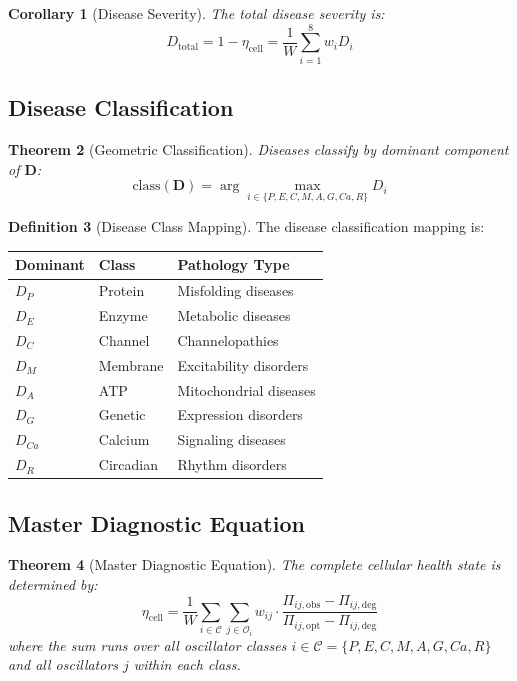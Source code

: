 \documentclass[10pt,twocolumn]{article}
\theoremstyle{plain}
\newtheorem{theorem}{Theorem}[section]
\newtheorem{corollary}[theorem]{Corollary}
\theoremstyle{definition}
\newtheorem{definition}[theorem]{Definition}
\theoremstyle{remark}
\newcommand{\etacell}{\eta_{\mathrm{cell}}}
\newcommand{\Dvec}{\mathbf{D}}
\begin{document}
\begin{corollary}[Disease Severity]
\label{cor:severity}
The total disease severity is:
\begin{equation}
D_{\mathrm{total}} = 1 - \etacell = \frac{1}{W}\sum_{i=1}^{8} w_i D_i
\label{eq:severity}
\end{equation}
\end{corollary}

\subsection{Disease Classification}

\begin{theorem}[Geometric Classification]
\label{thm:classification}
Diseases classify by dominant component of $\Dvec$:
\begin{equation}
\mathrm{class}(\Dvec) = \arg\max_{i \in \{P,E,C,M,A,G,Ca,R\}} D_i
\label{eq:classification}
\end{equation}
\end{theorem}

\begin{definition}[Disease Class Mapping]
\label{def:class_mapping}
The disease classification mapping is:
\begin{center}
\begin{tabular}{@{}lll@{}}
\toprule
Dominant & Class & Pathology Type \\
\midrule
$D_P$ & Protein & Misfolding diseases \\
$D_E$ & Enzyme & Metabolic diseases \\
$D_C$ & Channel & Channelopathies \\
$D_M$ & Membrane & Excitability disorders \\
$D_A$ & ATP & Mitochondrial diseases \\
$D_G$ & Genetic & Expression disorders \\
$D_{Ca}$ & Calcium & Signaling diseases \\
$D_R$ & Circadian & Rhythm disorders \\
\bottomrule
\end{tabular}
\end{center}
\end{definition}

\subsection{Master Diagnostic Equation}

\begin{theorem}[Master Diagnostic Equation]
\label{thm:master}
The complete cellular health state is determined by:
\begin{equation}
\boxed{
\etacell = \frac{1}{W}\sum_{i \in \mathcal{C}} \sum_{j \in \mathcal{O}_i} w_{ij} \cdot \frac{\Pi_{ij,\mathrm{obs}} - \Pi_{ij,\mathrm{deg}}}{\Pi_{ij,\mathrm{opt}} - \Pi_{ij,\mathrm{deg}}}
}
\label{eq:master}
\end{equation}
where the sum runs over all oscillator classes $i \in \mathcal{C} = \{P, E, C, M, A, G, Ca, R\}$ and all oscillators $j$ within each class.
\end{theorem}
\end{document}
